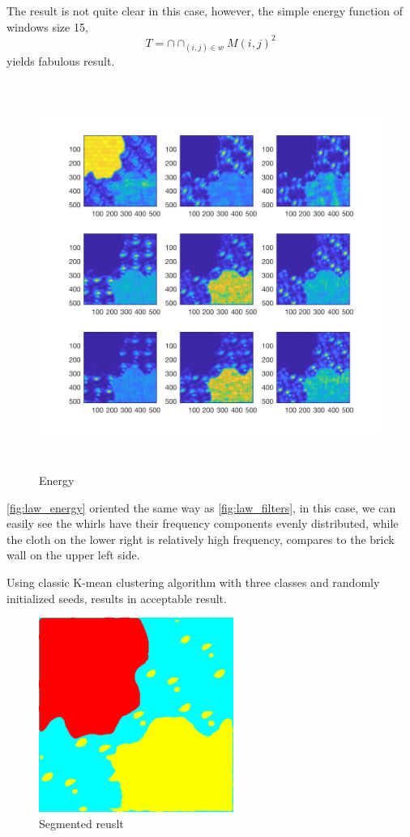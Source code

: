 \documentclass[12pt]{article}
\begin{document}
The result is not quite clear in this case, however, the simple energy function of windows size 15,
\begin{equation}
	T = \cap \cap_{(i, j) \in w} M(i, j)^2
\end{equation}
yields fabulous result.

\begin{figure}[H]
    \centering
    \includegraphics[height=5in]{images/T}
    \caption{Energy}
    \label{fig:law_energy}
\end{figure}
\autoref{fig:law_energy} oriented the same way as \autoref{fig:law_filters}, in this case, we can easily see the whirls have their frequency components evenly distributed, while the cloth on the lower right is relatively high frequency, compares to the brick wall on the upper left side.

Using classic K-mean clustering algorithm with three classes and randomly initialized seeds, results in acceptable result.

\begin{figure}[H]
    \centering
    \includegraphics[height=2.5in]{images/K}
    \caption{Segmented reuslt}
    \label{fig:kmean}
\end{figure}
\end{document}
